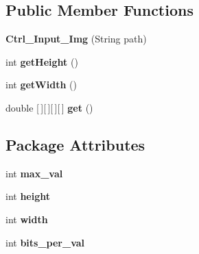 \subsection*{Public Member Functions}
\begin{DoxyCompactItemize}
\item 
\mbox{\label{classpersistencia_1_1input_1_1Ctrl__Input__Img_a79318a62df31dfd107554e92e29f6d9a}} 
{\bfseries Ctrl\+\_\+\+Input\+\_\+\+Img} (String path)
\item 
\mbox{\label{classpersistencia_1_1input_1_1Ctrl__Input__Img_a27e92d786d8f11ce165780984122ac8f}} 
int {\bfseries get\+Height} ()
\item 
\mbox{\label{classpersistencia_1_1input_1_1Ctrl__Input__Img_a4ceade2796ead750824c89f2a1e6dc47}} 
int {\bfseries get\+Width} ()
\item 
\mbox{\label{classpersistencia_1_1input_1_1Ctrl__Input__Img_ac549527b5947a7ec9f40d53e492f4ffa}} 
double \mbox{[}$\,$\mbox{]}\mbox{[}$\,$\mbox{]}\mbox{[}$\,$\mbox{]}\mbox{[}$\,$\mbox{]} {\bfseries get} ()
\end{DoxyCompactItemize}
\subsection*{Package Attributes}
\begin{DoxyCompactItemize}
\item 
\mbox{\label{classpersistencia_1_1input_1_1Ctrl__Input__Img_a1b8fa2d000a1d5d873be62d1f609e4be}} 
int {\bfseries max\+\_\+val}
\item 
\mbox{\label{classpersistencia_1_1input_1_1Ctrl__Input__Img_abc1dcc48714e9e74fb8ae0e0b81f91bf}} 
int {\bfseries height}
\item 
\mbox{\label{classpersistencia_1_1input_1_1Ctrl__Input__Img_a51dd0b9243b854aa25ac4532acca4524}} 
int {\bfseries width}
\item 
\mbox{\label{classpersistencia_1_1input_1_1Ctrl__Input__Img_a222ad0e7d241e5f396cf67c3b760f143}} 
int {\bfseries bits\+\_\+per\+\_\+val}
\end{DoxyCompactItemize}
